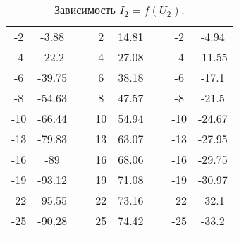 \documentclass[a4paper,11pt]{extarticle} %
\begin{document}
\begin{table}[h]
\begin{tabular}{|c|c|c|c|c|c|c|c|}
-2 & -3.88 & ~ & 2 & 14.81 & ~ & -2 & -4.94 \\ \cline{1-2} \cline{4-5} \cline{7-8}
-4 & -22.2 & ~ & 4 & 27.08 & ~ & -4 & -11.55 \\ \cline{1-2} \cline{4-5} \cline{7-8}
-6 & -39.75 & ~ & 6 & 38.18 & ~ & -6 & -17.1 \\ \cline{1-2} \cline{4-5} \cline{7-8}
-8 & -54.63 & ~ & 8 & 47.57 & ~ & -8 & -21.5 \\ \cline{1-2} \cline{4-5} \cline{7-8}
-10 & -66.44 & ~ & 10 & 54.94 & ~ & -10 & -24.67 \\ \cline{1-2} \cline{4-5} \cline{7-8}
-13 & -79.83 & ~ & 13 & 63.07 & ~ & -13 & -27.95 \\ \cline{1-2} \cline{4-5} \cline{7-8}
-16 & -89 & ~ & 16 & 68.06 & ~ & -16 & -29.75 \\ \cline{1-2} \cline{4-5} \cline{7-8}
-19 & -93.12 & ~ & 19 & 71.08 & ~ & -19 & -30.97 \\ \cline{1-2} \cline{4-5} \cline{7-8}
-22 & -95.55 & ~ & 22 & 73.16 & ~ & -22 & -32.1 \\ \cline{1-2} \cline{4-5} \cline{7-8} 
-25 & -90.28 & ~ & 25 & 74.42 & ~ & -25 & -33.2\\ \hline

\\ \cline{1-2} \cline{4-5} \cline{7-8} 
\end{tabular}
\caption{Зависимость $I_2 = f(U_2)$.}
\end{table}


















	
\end{document}
